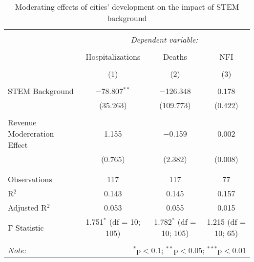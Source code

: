 
\begin{table}[!htbp] \centering 
  \caption{Moderating effects of cities’ development on the impact of STEM background} 
  \label{} 
\begin{tabular}{@{\extracolsep{5pt}}lccc} 
\\[-1.8ex]\hline 
\hline \\[-1.8ex] 
 & \multicolumn{3}{c}{\textit{Dependent variable:}} \\ 
\cline{2-4} 
\\[-1.8ex] & Hospitalizations & Deaths & NFI \\ 
\\[-1.8ex] & (1) & (2) & (3)\\ 
\hline \\[-1.8ex] 
 STEM Background & $-$78.807$^{**}$ & $-$126.348 & 0.178 \\ 
  & (35.263) & (109.773) & (0.422) \\ 
  & & & \\ 
 Revenue Modereration Effect & 1.155 & $-$0.159 & 0.002 \\ 
  & (0.765) & (2.382) & (0.008) \\ 
  & & & \\ 
\hline \\[-1.8ex] 
Observations & 117 & 117 & 77 \\ 
R$^{2}$ & 0.143 & 0.145 & 0.157 \\ 
Adjusted R$^{2}$ & 0.053 & 0.055 & 0.015 \\ 
F Statistic & 1.751$^{*}$ (df = 10; 105) & 1.782$^{*}$ (df = 10; 105) & 1.215 (df = 10; 65) \\ 
\hline 
\hline \\[-1.8ex] 
\textit{Note:}  & \multicolumn{3}{r}{$^{*}$p$<$0.1; $^{**}$p$<$0.05; $^{***}$p$<$0.01} \\ 
\end{tabular} 
\end{table} 
